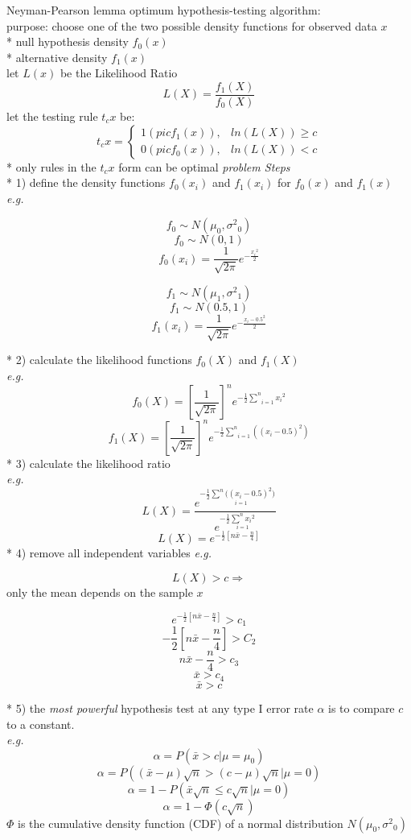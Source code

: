 \documentclass[10pt,landscape]{article}
\begin{document}
\begin{multicols}{3}
Neyman-Pearson lemma optimum hypothesis-testing algorithm: \\
purpose: choose one of the two possible density functions for observed data $x$ \\
* null hypothesis density $f_0(x)$ \\
* alternative density $f_1(x)$ \\
let $L(x)$ be the Likelihood Ratio
$$ L(X) = \frac{f_1(X)}{f_0(X)} $$
let the testing rule $t_c{x}$ be:
$$
t_c{x} = \begin{cases} 1(pic f_1(x)), & ln(L(X)) \geq c \\ 0(pic f_0(x)), & ln(L(X)) < c \end{cases}
$$
* only rules in the $t_c{x}$ form can be optimal
\emph{problem Steps} \\
* 1) define the density functions $f_0(x_i)$ and $f_1(x_i)$ for $f_0(x)$ and $f_1(x)$ \\
\emph{e.g.}
\begin{multicols}{2}
$$ f_0 \sim N(\mu_0,{\sigma^2}_0) $$
$$ f_0 \sim N(0,1) $$
$$ f_0(x_i) = \frac{1}{\sqrt{2 \pi}} e^{-\frac{{x_i}^2}{2}} $$

\pagebreak 
$$ f_1 \sim N(\mu_1,{\sigma^2}_1) $$
$$ f_1 \sim N(0.5,1) $$
$$ f_1(x_i) = \frac{1}{\sqrt{2 \pi}} e^{-\frac{{x_i - 0.5}^2}{2}} $$
\end{multicols}
* 2) calculate the likelihood functions $f_0(X)$ and $f_1(X)$ \\
\emph{e.g.}
$$ f_0(X) = \left[\frac{1}{\sqrt{2 \pi}}\right]^n e^{-\frac{1}{2} \underset{i=1}{\overset{n}{\sum}} {x_i}^2} $$
$$ f_1(X) = \left[\frac{1}{\sqrt{2 \pi}}\right]^n e^{-\frac{1}{2} \underset{i=1}{\overset{n}{\sum}} ((x_i - 0.5)^2)} $$
* 3) calculate the likelihood ratio \\
\emph{e.g.}
$$ L(X) = \frac{e^{-\frac{1}{2} \underset{i=1}{\overset{n}{\sum} ((x_i - 0.5)^2})}}{e^{-\frac{1}{2} \underset{i=1}{\overset{n}{\sum} {x_i}^2}}} $$
$$ L(X) = e^{-\frac{1}{2} \left[n \bar{x} - \frac{n}{4}\right]} $$
* 4) remove all independent variables
\emph{e.g.} \\
\begin{multicols}{2}
$$ L(X) > c \Rightarrow $$
only the mean depends on the sample $x$

\pagebreak 
$$ e^{-\frac{1}{2} \left[n \bar{x} - \frac{n}{4}\right]} > c_1 $$
$$ -\frac{1}{2} \left[n \bar{x} - \frac{n}{4}\right] > C_2 $$
$$ n \bar{x} - \frac{n}{4} > c_3 $$
$$ \bar{x} > c_4 $$
$$ \bar{x} > c $$
\end{multicols}
* 5) the \emph{most powerful} hypothesis test at any type I error rate $\alpha$ is to compare $c$ to a constant. \\
\emph{e.g.} \\
$$ \alpha = P(\bar{x} > c | \mu = \mu_0) $$
$$ \alpha = P((\bar{x} - \mu)\sqrt{n} > (c - \mu)\sqrt{n} | \mu = 0) $$
$$ \alpha = 1 - P(\bar{x}\sqrt{n} \leq c\sqrt{n} | \mu = 0) $$
$$ \alpha = 1 - \Phi(c\sqrt{n}) $$
$\Phi$ is the cumulative density function (CDF) of a normal distribution $N(\mu_0,{\sigma^2}_0)$ \\


\end{multicols}
\end{document}
